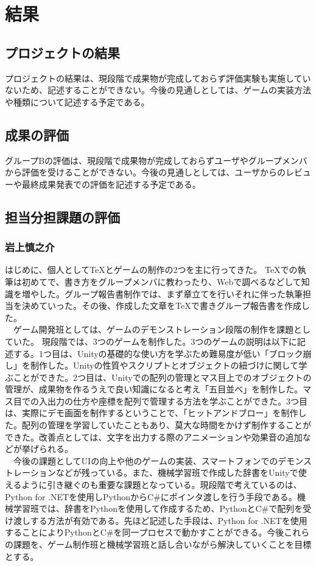 \chapter{結果}
\section{プロジェクトの結果}
プロジェクトの結果は、現段階で成果物が完成しておらず評価実験も実施していないため、記述することができない。今後の見通しとしては、ゲームの実装方法や種類について記述する予定である。

\section{成果の評価}
グループBの評価は、現段階で成果物が完成しておらずユーザやグループメンバから評価を受けることができない。今後の見通しとしては、ユーザからのレビューや最終成果発表での評価を記述する予定である。


\newpage
\section{担当分担課題の評価}
\subsection{岩上慎之介}
はじめに、個人としてTeXとゲームの制作の2つを主に行ってきた。
TeXでの執筆は初めてで、書き方をグループメンバに教わったり、Webで調べるなどして知識を増やした。グループ報告書制作では、まず章立てを行いそれに伴った執筆担当を決めていった。その後、作成した文章をTeXで書きグループ報告書を作成した。\\
　ゲーム開発班としては、ゲームのデモンストレーション段階の制作を課題としていた。
現段階では、3つのゲームを制作した。3つのゲームの説明は以下に記述する。1つ目は、Unityの基礎的な使い方を学ぶため難易度が低い「ブロック崩し」を制作した。Unityの性質やスクリプトとオブジェクトの紐づけに関して学ぶことができた。2つ目は、Unityでの配列の管理とマス目上でのオブジェクトの管理が、成果物を作るうえで良い知識になると考え「五目並べ」を制作した。マス目での入出力の仕方や座標を配列で管理する方法を学ぶことができた。3つ目は、実際にデモ画面を制作するということで、「ヒットアンドブロー」を制作した。配列の管理を学習していたこともあり、莫大な時間をかけず制作することができた。改善点としては、文字を出力する際のアニメーションや効果音の追加などが挙げられる。\\
　今後の課題としてUIの向上や他のゲームの実装、スマートフォンでのデモンストレーションなどが残っている。また、機械学習班で作成した辞書をUnityで使えるように引き継ぐのも重要な課題となっている。現段階で考えているのは、Python for .NETを使用しPythonからC\#にポインタ渡しを行う手段である。機械学習班では、辞書をPythonを使用して作成するため、PythonとC\#で配列を受け渡しする方法が有効である。先ほど記述した手段は、Python for .NETを使用することによりPythonとC\#を同一プロセスで動かすことができる。今後これらの課題を、ゲーム制作班と機械学習班と話し合いながら解決していくことを目標とする。

